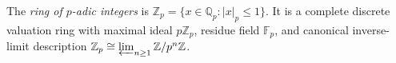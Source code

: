 
The \emph{ring of $p$-adic integers} is $\mathbb Z_p=\{x\in\mathbb Q_p:|x|_p\le1\}$. It is a complete discrete valuation ring with maximal ideal $p\mathbb Z_p$, residue field $\mathbb F_p$, and canonical inverse-limit description $\mathbb Z_p\cong\varprojlim_{n\ge1}\mathbb Z/p^n\mathbb Z$.
